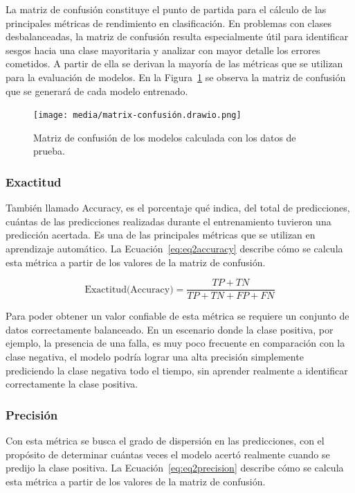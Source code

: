 \documentclass[11pt,a4paper,spanish]{book}
\numberwithin{equation}{chapter}
\numberwithin{figure}{chapter}
\begin{document}
La matriz de confusión constituye el punto de partida para el cálculo de las principales métricas de rendimiento en clasificación. En problemas con clases desbalanceadas, la matriz de confusión resulta especialmente útil para identificar sesgos hacia una clase mayoritaria y analizar con mayor detalle los errores cometidos. A partir de ella se derivan la mayoría de las métricas que se utilizan para la evaluación de modelos. En la Figura~\ref{fig:figMatrixConfusion} se observa la matriz de confusión que se generará de cada modelo entrenado. 



\begin{figure}[h]
    \centering
    \texttt{[image: media/matrix-confusión.drawio.png]}
    \caption{Matriz de confusión de los modelos calculada con los datos de prueba.}
    \label{fig:figMatrixConfusion}
\end{figure}


\subsubsection{Exactitud}

También llamado Accuracy, es el porcentaje qué indica, del total de predicciones, cuántas de las predicciones realizadas durante el entrenamiento tuvieron una predicción acertada. Es una de las principales métricas que se utilizan en aprendizaje automático. La Ecuación~\eqref{eq:eq2accuracy} describe cómo se calcula esta métrica a partir de los valores de la matriz de confusión. 

\begin{equation}\label{eq:eq2accuracy}
\text{Exactitud(Accuracy)} = \frac{TP + TN}{TP + TN + FP + FN}
\end{equation}

Para poder obtener un valor confiable de esta métrica se requiere un conjunto de datos correctamente balanceado.  En un escenario donde la clase positiva, por ejemplo, la presencia de una falla, es muy poco frecuente en comparación con la clase negativa, el modelo podría lograr una alta precisión simplemente prediciendo la clase negativa todo el tiempo, sin aprender realmente a identificar correctamente la clase positiva.

\subsubsection{Precisión}

Con esta métrica se busca el grado de dispersión en las predicciones, con el propósito de determinar cuántas veces el modelo acertó realmente cuando se predijo la clase positiva. La Ecuación~\eqref{eq:eq2precision} describe cómo se calcula esta métrica a partir de los valores de la matriz de confusión. 
\end{document}
